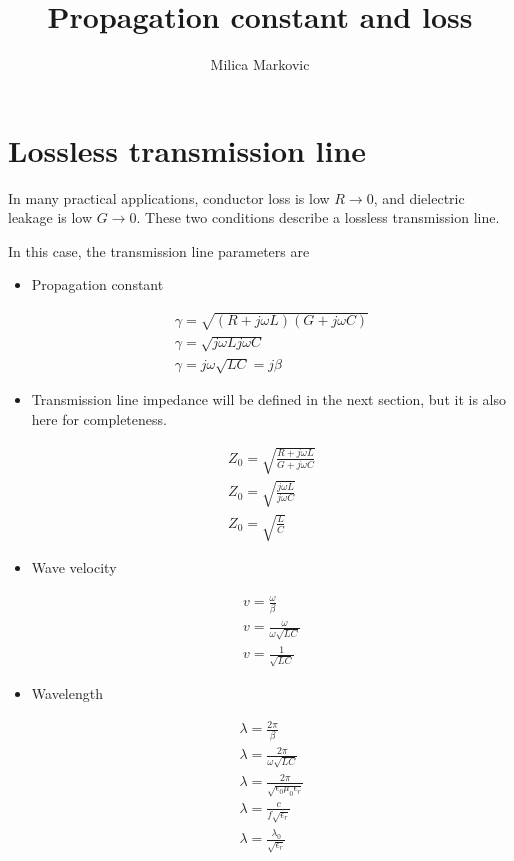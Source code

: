 \documentclass{ximera}
\title{Propagation constant and loss}
\author{Milica Markovic}
\begin{document}
  
\begin{abstract}  

\end{abstract}  
\maketitle    





\section{Lossless transmission line}


In many practical applications, conductor loss is low $R\to 0$, and dielectric leakage is low $G \to 0$. These two conditions describe a
lossless transmission line.

In this case, the transmission line parameters are
\begin{itemize}
\item Propagation constant


\begin{eqnarray}
\gamma =\sqrt{(R+j\omega L)(G+ j\omega C)} \nonumber   \\ \nonumber
\gamma= \sqrt{j \omega L j \omega C} \\ \nonumber
\gamma = j \omega \sqrt{L C} = j \beta
\end{eqnarray}

\item Transmission line impedance will be defined in the next section, but it is also here for completeness.

\begin{eqnarray}
Z_0=\sqrt{\frac{R+j\omega L}{G+ j\omega C}} \nonumber  \\ \nonumber
Z_0=\sqrt{\frac{j\omega L}{ j\omega C}} \\ \nonumber
Z_0=\sqrt{\frac{L}{C}}
\end{eqnarray}

\item Wave velocity

\begin{eqnarray}
v=\frac{\omega}{\beta}  \nonumber \\ \nonumber
v=\frac{\omega}{\omega \sqrt{LC}} \\ \nonumber
v=\frac{1}{\sqrt{LC}}
\end{eqnarray}


\item Wavelength


\begin{eqnarray}
\lambda = \frac{2 \pi}{\beta}  \nonumber \\ \nonumber
\lambda = \frac{2 \pi}{ \omega \sqrt{LC}} \\ \nonumber
\lambda =\frac{2 \pi}{\sqrt{\epsilon_0 \mu_0 \epsilon_r} } \\ \nonumber
\lambda = \frac{c}{f \sqrt{\epsilon_r}} \\ \nonumber
\lambda = \frac{\lambda_0}{\sqrt{\epsilon_r}} \nonumber
\end{eqnarray}
\end{itemize}
\end{document}
